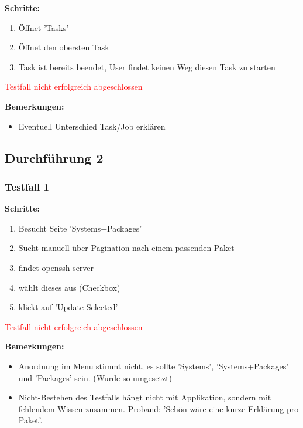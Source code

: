 \textbf{Schritte:}

\begin{enumerate}
    \item Öffnet 'Tasks'
    \item Öffnet den obersten Task
    \item Task ist bereits beendet, User findet keinen Weg diesen Task zu starten
\end{enumerate}

\textcolor{Red}{Testfall nicht erfolgreich abgeschlossen}

\bigskip
\textbf{Bemerkungen:}

\begin{itemize}[noitemsep,nolistsep]
    \item Eventuell Unterschied Task/Job erklären
\end{itemize}



\subsection*{Durchführung 2}

\xxx

\subsubsection*{Testfall 1}

\textbf{Schritte:}

\begin{enumerate}
    \item Besucht Seite 'Systems+Packages'
    \item Sucht manuell über Pagination nach einem passenden Paket
    \item findet openssh-server
    \item wählt dieses aus (Checkbox)
    \item klickt auf 'Update Selected'
\end{enumerate}

\textcolor{Red}{Testfall nicht erfolgreich abgeschlossen}

\bigskip
\textbf{Bemerkungen:}

\begin{itemize}[noitemsep,nolistsep]
    \item Anordnung im Menu stimmt nicht, es sollte 'Systems', 'Systems+Packages' und 'Packages' sein. (Wurde so umgesetzt)
    \item Nicht-Bestehen des Testfalls hängt nicht mit Applikation, sondern mit fehlendem Wissen zusammen. Proband: 'Schön wäre eine kurze Erklärung pro Paket'.
\end{itemize}


